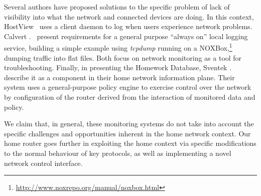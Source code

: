 

Several authors have proposed solutions to the specific problem of
lack of visibility into what the network and connected devices are
doing.  In this context, HostView~\cite{joumblatt10:_hostv} uses a
client daemon to log when users experience network problems.
Calvert \etal.~\cite{calvert10:_instr_home_networ}
present requirements for a general purpose ``always on'' local logging
service, building a simple example using \emph{tcpdump} running on a
NOXBox,\footnote{\url{http://www.noxrepo.org/manual/noxbox.html}}
dumping traffic into flat files.  Both focus on network monitoring as
a tool for troubleshooting.  Finally, in presenting the Homework
Database, Sventek
\etal.~\cite{sventek11:_infor_plane_archit_suppor_home_networ_manag}
describe it as a component in their home network information plane.
Their system uses a general-purpose policy engine to exercise control
over the network by configuration of the router derived from the
interaction of monitored data and policy.

We claim that, in general, these monitoring systems do
not take into account the specific challenges and opportunities
inherent in the home network context.  Our home router goes further in
exploiting the home context via specific modifications to the normal
behaviour of key protocols, as well as implementing a novel network
control interface.

